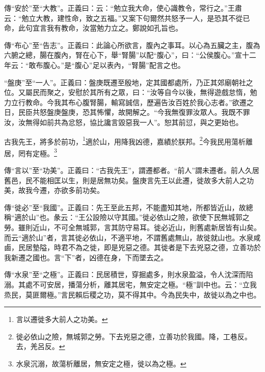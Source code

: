 {\noindent\zhuan{}\fzbyks 傳“安於”至“大教”。正義曰：云：“勉立我大命，使心識教令，常行之。”王肅云：“勉立大教，建性命，致之五福。”又案下句爾然共怒予一人，是恐其不從已命，此句宜言我有教命，汝當勉力立之。鄭說如孔旨也。 \par}

{\noindent\zhuan{}\fzbyks 傳“布心”至“告志”。正義曰：此論心所欲言，腹內之事耳。以心為五臟之主，腹為六腑之總，腸在腹內，腎在心下，舉“腎腸”以配“腹心”，曰：“公侯腹心。”宣十二年云：“敢布腹心。”是“腹心”足以表內，“腎腸”配言之也。 \par}

{\noindent\shu{}\fzkt “盤庚”至“一人”。正義曰：盤庚既遷至殷地，定其國都處所，乃正其郊廟朝社之位。又屬民而聚之，安慰於其所有之眾，曰：“汝等自今以後，無得遊戲怠惰，勉力立行教命。今我其布心腹腎腸，輸寫誠信，歷遍告汝百姓於我心志者。”欲遷之日，民臣共怒盤庚盤庚，恐其怖懼，故開解之。“今我無復罪汝眾人。我既不罪汝，汝無得如前共為忿怒，協比讒言毀惡我一人”。恕其前愆，與之更始也。 \par}

古我先王，將多於前功，\footnote{言以遷徙多大前人之功美。}適於山，用降我凶德，嘉績於朕邦。\footnote{徙必依山之險，無城郭之勞。下去兇惡之德，立善功於我國。降，工巷反。去，羌呂反。}今我民用蕩析離居，罔有定極。\footnote{水泉沉溺，故蕩析離居，無安定之極，徙以為之極。}

{\noindent\zhuan{}\fzbyks 傳“言以”至“功美”。正義曰：“古我先王”，謂遷都者。“前人”謂未遷者。前人久居舊邑，民不能相匡以生，則是居無功矣。盤庚言先王以此遷，徙故多大前人之功美，故我今遷，亦欲多前功矣。 \par}

{\noindent\zhuan{}\fzbyks 傳“徙必”至“我國”。正義曰：先王至此五邦，不能盡知其地，所都皆近山，故總稱“適於山”也。彖云：“王公設險以守其國。”徙必依山之險，欲使下民無城郭之勞。雖則近山，不可全無城郭，言其防守易耳。徙必近山，則舊處新居皆有山矣。而云“適於山”者，言其徙必依山，不適平地，不謂舊處無山，故徙就山也。水泉咸鹵，民居墊隘，時君不為之徙，即是兇惡之德。其徙者是下去兇惡之德，立善功於我新遷之國也。言“下”者，凶德在身，下而墜去之。 \par}

{\noindent\zhuan{}\fzbyks 傳“水泉”至“之極”。正義曰：民居積世，穿掘處多，則水泉盈溢，令人沈深而陷溺。其處不可安居，播蕩分析，離其居宅，無安定之極。“極”訓中也。云：“立我烝民，莫匪爾極。”言民賴后稷之功，莫不得其中。今為民失中，故徙以為之中也。 \par}

